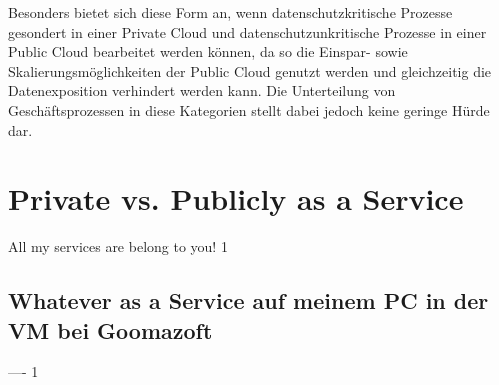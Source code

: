\documentclass[journal]{IEEEtran}
\begin{document}
Besonders bietet sich diese Form an, wenn datenschutzkritische Prozesse gesondert in einer Private Cloud und datenschutzunkritische Prozesse in einer Public Cloud bearbeitet werden können, da so die Einspar- sowie Skalierungsmöglichkeiten der Public Cloud genutzt werden und gleichzeitig die Datenexposition verhindert werden kann. Die Unterteilung von Geschäftsprozessen in diese Kategorien stellt dabei jedoch keine geringe Hürde dar.

\section{Private vs. Publicly as a Service}
All my services are belong to you!
1

\subsection{Whatever as a Service auf meinem PC in der VM bei Goomazoft}
----
1

%
%

\end{document}
